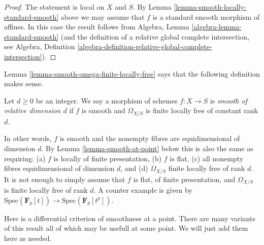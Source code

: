 \begin{proof}
The statement is local on $X$ and $S$.
By Lemma \ref{lemma-smooth-locally-standard-smooth}
above we may assume that $f$ is a standard smooth morphism of affines.
In this case the result follows from
Algebra, Lemma \ref{algebra-lemma-standard-smooth}
(and the definition of a relative global complete intersection, see
Algebra,
Definition \ref{algebra-definition-relative-global-complete-intersection}).
\end{proof}

\noindent
Lemma \ref{lemma-smooth-omega-finite-locally-free}
says that the following definition makes sense.

\begin{definition}
\label{definition-smooth-relative-dimension}
Let $d \geq 0$ be an integer. We say a morphism of schemes $f : X \to S$
is {\it smooth of relative dimension $d$} if $f$ is smooth and
$\Omega_{X/S}$ is finite locally free of constant rank $d$.
\end{definition}

\noindent
In other words, $f$ is smooth and the nonempty fibres are equidimensional
of dimension $d$. By Lemma \ref{lemma-smooth-at-point} below this is also
the same as requiring: (a) $f$ is locally of finite presentation, (b) $f$ is
flat, (c) all nonempty fibres equidimensional of dimension $d$, and (d)
$\Omega_{X/S}$ finite locally free of rank $d$. It is not enough to simply
assume that $f$ is flat, of finite presentation, and $\Omega_{X/S}$ is
finite locally free of rank $d$. A counter example is given by
$\text{Spec}(\mathbf{F}_p[t]) \to \text{Spec}(\mathbf{F}_p[t^p])$.

\medskip\noindent
Here is a differential criterion of smoothness at a point.
There are many variants of this result
all of which may be usefull at some point. We will just add them
here as needed.

